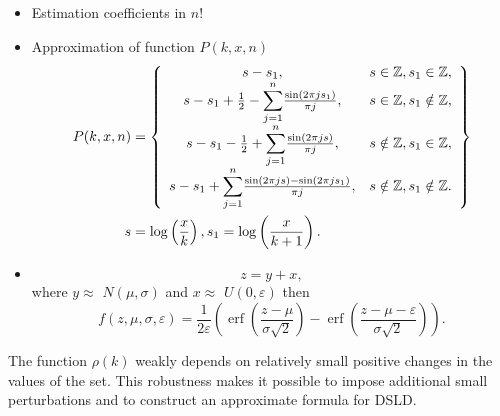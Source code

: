\documentclass[titlepage,fleqn]{article}%
\providecommand{\U}[1]{\protect\rule{.1in}{.1in}}
\begin{document}
\begin{itemize}
\item Estimation coefficients in $n!$

\item Approximation of function $P(k,x,n)$
\begin{align}
P(k,x,n)  &  =\left\{
\begin{array}
[c]{cc}%
s-s_{1}, & s\in%
\mathbb{Z}
,s_{1}\in%
\mathbb{Z}
,\\
s-s_{1}+\frac{1}{2}-%
{\displaystyle\sum\limits_{j=1}^{n}}
\frac{\sin(2\pi js_{1})}{\pi j}, & s\in%
\mathbb{Z}
,s_{1}\notin%
\mathbb{Z}
,\\
s-s_{1}-\frac{1}{2}+%
{\displaystyle\sum\limits_{j=1}^{n}}
\frac{\sin(2\pi js)}{\pi j}, & s\notin%
\mathbb{Z}
,s_{1}\in%
\mathbb{Z}
,\\
s-s_{1}+%
{\displaystyle\sum\limits_{j=1}^{n}}
\frac{\sin(2\pi js)-\sin(2\pi js_{1})}{\pi j}, & s\notin%
\mathbb{Z}
,s_{1}\notin%
\mathbb{Z}
.
\end{array}
\right\} \label{RHOa}\\
s  &  =\log\left(  \frac{x}{k}\right)  ,s_{1}=\log\left(  \frac{x}%
{k+1}\right)  .\nonumber
\end{align}


\item
\[
z=y+x,
\]
where $y\approx$ $N(\mu,\sigma)$ and $x\approx$ $U(0,\varepsilon)$ then%
\[
f(z,\mu,\sigma,\varepsilon)=\frac{1}{2\varepsilon}\left(  \operatorname{erf}%
\left(  \frac{z-\mu}{\sigma\sqrt{2}}\right)  -\operatorname{erf}\left(
\frac{z-\mu-\varepsilon}{\sigma\sqrt{2}}\right)  \right)  .
\]

\end{itemize}

The function $\rho(k)$ weakly depends on relatively small positive changes in
the values of the set. This robustness makes it possible to impose additional
small perturbations and to construct an approximate formula for DSLD.
\end{document}
